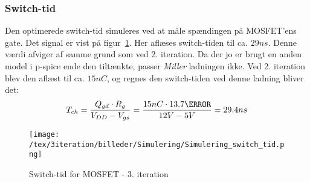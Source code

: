 
\subsubsection{Switch-tid}
Den optimerede switch-tid simuleres ved at måle spændingen på MOSFET'ens gate. Det signal er vist på figur~\ref{fig:switch_tid_3}. Her aflæses switch-tiden til ca. $29ns$. Denne værdi afviger af samme grund som ved 2. iteration. Da der jo er brugt en anden model i p-spice ende den tiltænkte, passer \textit{Miller} ladningen ikke. Ved 2. iteration blev den aflæst til ca. $15nC$, og regnes den switch-tiden ved denne ladning bliver det:
\begin{equation} 
T_{ch} = \frac{Q_{gd} \cdot R_{g}}{V_{DD}-V_{gs}} = \frac{15nC \cdot 13.7\ohm}{12V-5V} = 29.4ns
\end{equation}

\begin{figure}[H]
	\center
	\texttt{[image: /tex/3iteration/billeder/Simulering/Simulering\_switch\_tid.png]}
	\caption{Switch-tid for MOSFET - 3. iteration}
	\label{fig:switch_tid_3}
\end{figure}